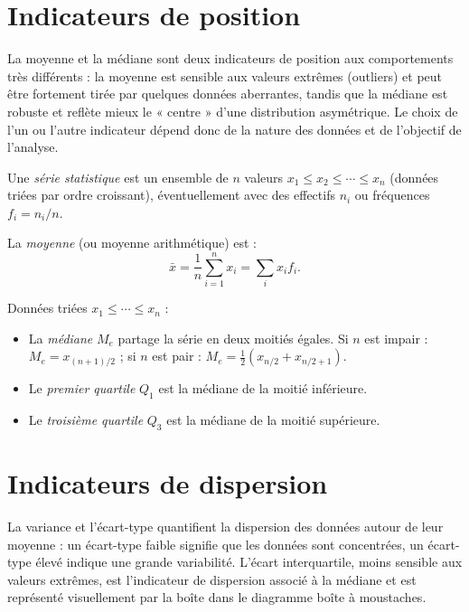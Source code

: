 \documentclass[11pt,a4paper,twoside]{book}
\begin{document}
\section{Indicateurs de position}

La moyenne et la médiane sont deux indicateurs de position aux comportements très différents : la moyenne est sensible aux valeurs extrêmes (outliers) et peut être fortement tirée par quelques données aberrantes, tandis que la médiane est robuste et reflète mieux le « centre » d'une distribution asymétrique. Le choix de l'un ou l'autre indicateur dépend donc de la nature des données et de l'objectif de l'analyse.

\begin{definitionbox}
Une \emph{série statistique} est un ensemble de $n$ valeurs $x_1 \leq x_2 \leq \cdots \leq x_n$ (données triées par ordre croissant), éventuellement avec des effectifs $n_i$ ou fréquences $f_i=n_i/n$.
\end{definitionbox}

\begin{definitionbox}[Moyenne]
La \emph{moyenne} (ou moyenne arithmétique) est :
\[
  \bar{x} = \frac{1}{n}\sum_{i=1}^n x_i = \sum_i x_i f_i.
\]
\end{definitionbox}

\begin{definitionbox}
Données triées $x_1\leq\cdots\leq x_n$ :
\begin{itemize}
  \item La \emph{médiane} $M_e$ partage la série en deux moitiés égales.
    Si $n$ est impair : $M_e = x_{(n+1)/2}$ ; si $n$ est pair : $M_e = \frac{1}{2}(x_{n/2}+x_{n/2+1})$.
  \item Le \emph{premier quartile} $Q_1$ est la médiane de la moitié inférieure.
  \item Le \emph{troisième quartile} $Q_3$ est la médiane de la moitié supérieure.
\end{itemize}
\end{definitionbox}

\section{Indicateurs de dispersion}

La variance et l'écart-type quantifient la dispersion des données autour de leur moyenne : un écart-type faible signifie que les données sont concentrées, un écart-type élevé indique une grande variabilité. L'écart interquartile, moins sensible aux valeurs extrêmes, est l'indicateur de dispersion associé à la médiane et est représenté visuellement par la boîte dans le diagramme boîte à moustaches.
\end{document}
